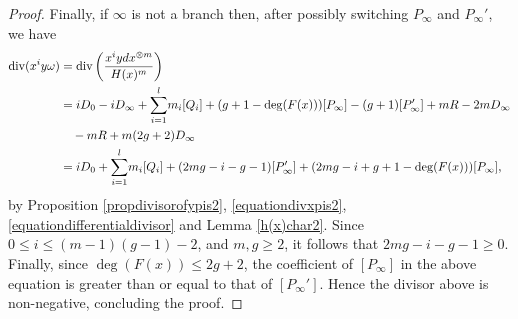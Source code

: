\begin{proof}
    Finally, if $\infty$ is not a branch then, after possibly switching $P_\infty$ and $P_\infty'$, we have
        \begin{align*}
        \operatorname{div}(x^iy\omega) &  =  \operatorname{div} \left( \frac{x^i ydx^{\otimes m}}{H(x)^m} \right)\\ 
        & = iD_0 - iD_\infty + {\displaystyle \sum_{i=1}^l} m_i[Q_i] + (g+1-\deg(F(x)))[P_\infty] - (g+1)[P_\infty'] + mR - 2mD_\infty \\
        & \hspace{1em} - mR + m(2g+2)D_\infty \\
        & =  iD_0 + {\displaystyle \sum_{i=1}^l} m_i[Q_i] + (2mg - i - g - 1)[P_\infty'] + (2mg - i +g + 1 - \deg(F(x)))[P_\infty],
        \end{align*}
    by Proposition \ref{propdivisorofypis2}, \eqref{equationdivxpis2}, \eqref{equationdifferentialdivisor} and Lemma \ref{h(x)char2}.
    Since $0 \leq i \leq (m-1)(g-1) - 2$, and $m, g \geq 2$, it follows that $2mg - i  - g - 1 \geq 0$.
    Finally, since $\deg(F(x)) \leq 2g+2$, the coefficient of $[P_\infty]$ in the above equation is greater than or equal to that of $[P_\infty']$.
    Hence the divisor above is non-negative, concluding the proof.
    \end{proof}






















